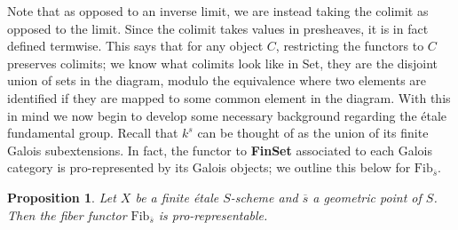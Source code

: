 \documentclass{article}
\theoremstyle{definition}
\theoremstyle{remark}
\theoremstyle{plain}
\newtheorem{proposition}[theorem]{Proposition}
\begin{document}
Note that as opposed to an inverse limit, we are instead taking the colimit as opposed to the limit.
Since the colimit takes values in presheaves, it is in fact defined termwise.
This says that for any object $C$, restricting the functors to $C$ preserves colimits; we know what colimits look like in Set, they are the disjoint union of sets in the diagram, modulo the equivalence where two elements are identified if they are mapped to some common element in the diagram. 
With this in mind we now begin to develop some necessary background regarding the \'etale fundamental group.
Recall that $k^s$ can be thought of as the union of its finite Galois subextensions.
In fact, the functor to \textbf{FinSet} associated to each Galois category is pro-represented by its Galois objects; we outline this below for $\text{Fib}_{\overline{s}}$.

\begin{proposition}
	Let $X$ be a finite \'etale $S$-scheme and $\overline{s}$ a geometric point of $S$.
	Then the fiber functor $\text{Fib}_{\overline{s}}$ is pro-representable.
\end{proposition}
\end{document}
